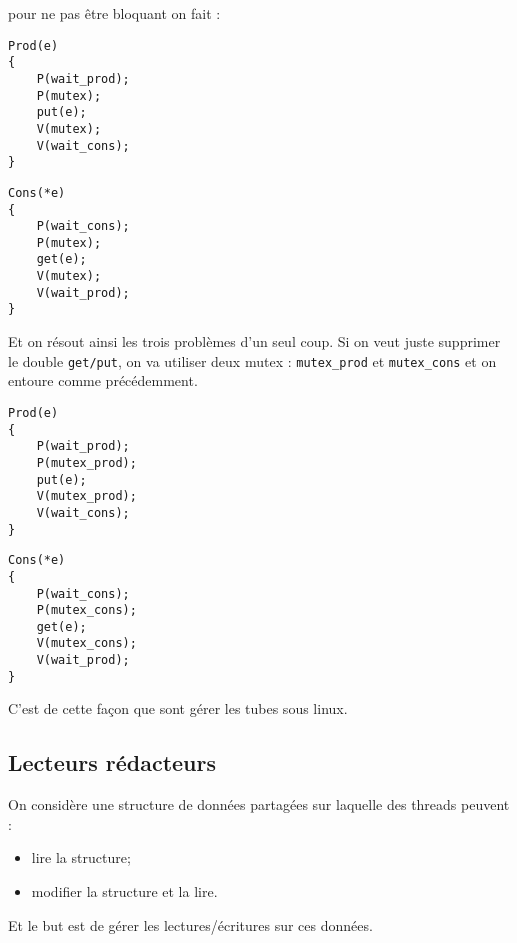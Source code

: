 \documentclass[12pt,a4paper]{report}
\begin{document}
\medskip

pour ne pas être bloquant on fait :

\medskip

\begin{minipage}{0.5\linewidth}
\begin{verbatim}
Prod(e)
{
    P(wait_prod);
    P(mutex);
    put(e);
    V(mutex);
    V(wait_cons);
}
\end{verbatim}
\end{minipage}
\begin{minipage}{0.5\linewidth}
\begin{verbatim}
Cons(*e)
{
    P(wait_cons);
    P(mutex);
    get(e);
    V(mutex);
    V(wait_prod);
}
\end{verbatim}
\end{minipage}

\medskip

Et on résout ainsi les trois problèmes d'un seul coup. Si on veut juste supprimer le double \verb?get/put?, on va utiliser deux mutex : \verb?mutex_prod? et \verb?mutex_cons? et on entoure comme précédemment.\\

\medskip

\begin{minipage}{0.5\linewidth}
\begin{verbatim}
Prod(e)
{
    P(wait_prod);
    P(mutex_prod);
    put(e);
    V(mutex_prod);
    V(wait_cons);
}
\end{verbatim}
\end{minipage}
\begin{minipage}{0.5\linewidth}
\begin{verbatim}
Cons(*e)
{
    P(wait_cons);
    P(mutex_cons);
    get(e);
    V(mutex_cons);
    V(wait_prod);
}
\end{verbatim}
\end{minipage}

\medskip
C'est de cette façon que sont gérer les tubes sous linux.


\subsection{Lecteurs rédacteurs}

On considère une structure de données partagées sur laquelle des threads peuvent :
\begin{itemize}
\item lire la structure;
\item modifier la structure et la lire.
\end{itemize}
Et le but est de gérer les lectures/écritures sur ces données.
\end{document}
